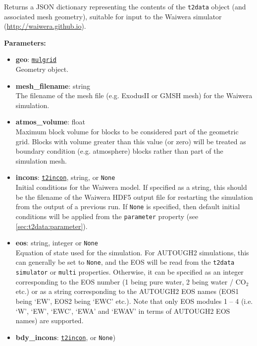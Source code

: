 Returns a JSON dictionary representing the contents of the \texttt{t2data} object (and associated
mesh geometry), suitable for input to the Waiwera simulator (\url{http://waiwera.github.io}).

\textbf{Parameters:}
\begin{itemize}
\item \textbf{geo}: \hyperref[mulgrids]{\texttt{mulgrid}}\\
  Geometry object.
\item \textbf{mesh\_filename}: string\\
  The filename of the mesh file (e.g. ExodusII or GMSH mesh) for the Waiwera simulation.
\item \textbf{atmos\_volume}: float\\
  Maximum block volume for blocks to be considered part of the geometric grid. Blocks with volume greater than this value (or zero) will be treated as boundary condition (e.g. atmosphere) blocks rather than part of the simulation mesh.
\item \textbf{incons}: \hyperref[incons]{\texttt{t2incon}}, string, or \texttt{None}\\
  Initial conditions for the Waiwera model. If specified as a string, this should be the filename of the Waiwera HDF5 output file for restarting the simulation from the output of a previous run. If \texttt{None} is specified, then default initial conditions will be applied from the \texttt{parameter} property (see \ref{sec:t2data:parameter}).  
\item \textbf{eos}: string, integer or \texttt{None}\\
  Equation of state used for the simulation. For AUTOUGH2 simulations, this can generally be set to \texttt{None}, and the EOS will be read from the \texttt{t2data} \texttt{simulator} or \texttt{multi} properties. Otherwise, it can be specified as an integer corresponding to the EOS number (1 being pure water, 2 being water / CO$_2$ etc.) or as a string corresponding to the AUTOUGH2 EOS names (EOS1 being `EW', EOS2 being `EWC' etc.). Note that only EOS modules 1 -- 4 (i.e. `W', `EW', `EWC', `EWA' and `EWAV' in terms of AUTOUGH2 EOS names) are supported.
\item \textbf{bdy\_incons}: \hyperref[incons]{\texttt{t2incon}}, or \texttt{None})\\

\end{itemize}

